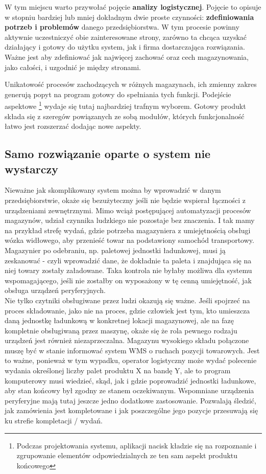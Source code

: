 	W tym miejscu warto przywołać pojęcie \textbf{analizy logistycznej}. Pojęcie to opisuje w stopniu
	bardziej lub mniej dokładnym dwie proste czynności: \textbf{zdefiniowania potrzeb i problemów} 
	danego przedsiębiorstwa. W tym procesie powinny aktywnie uczestniczyć obie zainteresowane strony, 
	zarówno ta chcąca uzyskać działający i gotowy do użytku system, jak i firma dostarczająca
	rozwiązania. Ważne jest aby zdefiniować jak najwięcej zachować oraz cech magazynowania, jako całości,
	i uzgodnić je między stronami. 	
		
	Unikatowość procesów zachodzących w różnych magazynach, ich zmienny zakres generują popyt
	na program gotowy do spełniania tych funkcji. Podejście aspektowe \footnote{
		Podczas projektowania systemu, aplikacji nacisk kładzie się na rozpoznanie i
		zgrupowanie elementów odpowiedzialnych ze ten sam aspekt produktu końcowego	
	} wydaje się tutaj najbardziej trafnym wyborem. Gotowy produkt składa się z szeregów
	powiązanych ze sobą modułów, których funkcjonalność łatwo jest rozszerzać dodając nowe
	aspekty.

	\subsection{Samo rozwiązanie oparte o system nie wystarczy}
	Nieważne jak skomplikowany system można by wprowadzić w danym przedsiębiorstwie, okaże się
	bezużyteczny jeśli nie będzie wspierał łączności z urządzeniami zewnętrznymi. Mimo wciąż 
	postępującej automatyzacji procesów magazynów, udział czynnika ludzkiego nie pozostaje bez 
	znaczenia. I tak mamy na przykład strefę wydań, gdzie potrzeba magazyniera z umiejętnością
	obsługi wózka widłowego, aby przenieść towar na podstawiony samochód transportowy. 
	Magazynier po odebraniu, np. paletowej jednostki ładunkowej, musi ją zeskanować - czyli
	wprowadzić dane, że dokładnie ta paleta i znajdująca się na niej towary zostały załadowane.
	Taka kontrola nie byłaby możliwa dla systemu wspomagającego, jeśli nie zostałby on wyposażony
	w tę cenną umiejętność, jak obsługa urządzeń peryferyjnych. \\
	
	Nie tylko czytniki obsługiwane przez ludzi okazują się ważne. Jeśli spojrzeć na proces składowanie,
	jako nie na proces, gdzie człowiek jest tym, kto umieszcza daną jednostkę ładunkową w konkretnej lokacji
	magazynowej, ale na fazę kompletnie obsługiwaną przez maszynę, okaże się że rola pewnego
	rodzaju urządzeń jest również niezaprzeczalna. Magazynu wysokiego składu połączone muszę być w stanie
	informować system WMS o ruchach pozycji towarowych. Jest to ważne, ponieważ w tym wypadku, operator
	logistyczny może wydać polecenie wydania określonej liczby palet produktu X na bandę Y, ale to program
	komputerowy musi wiedzieć, skąd, jak i gdzie poprowadzić jednostki ładunkowe, aby stan
	końcowy był zgodny ze stanem oczekiwanym. Wspomniane urządzenia peryferyjne mają tutaj jeszcze jedno
	dodatkowe zastosowanie. Pozwalają śledzić, jak zamówienia jest kompletowane i jak poszczególne
	jego pozycje przesuwają się ku strefie kompletacji / wydań. 
	

